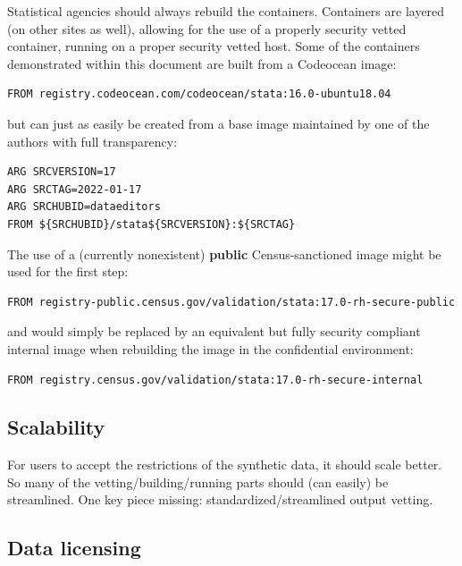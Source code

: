 \documentclass[inline]{hdsr}
\begin{document}
Statistical agencies should always rebuild the containers. Containers are layered (on other sites as well), allowing for the use of a properly security vetted container, running on a proper security vetted host. Some of the containers demonstrated within this document are built from a Codeocean image:

\begin{lstlisting}[language=docker]
FROM registry.codeocean.com/codeocean/stata:16.0-ubuntu18.04
\end{lstlisting}

\noindent but can just as easily be created from a base image maintained by one of the authors with full transparency:

\begin{lstlisting}[language=docker]
ARG SRCVERSION=17
ARG SRCTAG=2022-01-17
ARG SRCHUBID=dataeditors
FROM ${SRCHUBID}/stata${SRCVERSION}:${SRCTAG}
\end{lstlisting}

\noindent The use of a  (currently nonexistent) \textbf{public}  Census-sanctioned image might be used for the first step:

\begin{lstlisting}[language=docker]
FROM registry-public.census.gov/validation/stata:17.0-rh-secure-public
\end{lstlisting}

\noindent and would simply be replaced by an equivalent but fully security compliant internal image when rebuilding the image in the confidential environment:

\begin{lstlisting}[language=docker]
FROM registry.census.gov/validation/stata:17.0-rh-secure-internal
\end{lstlisting}



\subsection{Scalability}

For users to accept the restrictions of the synthetic data, it should scale better. So many of the vetting/building/running parts should (can easily) be streamlined. One key piece missing: standardized/streamlined output vetting.

\subsection{Data licensing}
\end{document}
